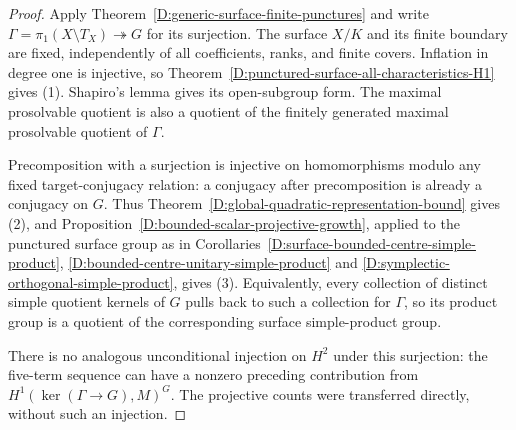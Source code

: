 \begin{proof}
Apply Theorem~\ref{D:generic-surface-finite-punctures} and write
$\Gamma=\pi_1(X\setminus T_X)\twoheadrightarrow G$ for its surjection.
The surface $X/K$ and its finite boundary are fixed, independently of
all coefficients, ranks, and finite covers. Inflation in degree one is
injective, so Theorem~\ref{D:punctured-surface-all-characteristics-H1}
gives (1). Shapiro's lemma gives its open-subgroup form. The maximal
prosolvable quotient is also a quotient of the finitely generated
maximal prosolvable quotient of $\Gamma$.

Precomposition with a surjection is injective on homomorphisms modulo
any fixed target-conjugacy relation: a conjugacy after precomposition
is already a conjugacy on $G$. Thus
Theorem~\ref{D:global-quadratic-representation-bound} gives (2), and
Proposition~\ref{D:bounded-scalar-projective-growth}, applied to the
punctured surface group as in
Corollaries~\ref{D:surface-bounded-centre-simple-product},
\ref{D:bounded-centre-unitary-simple-product} and
\ref{D:symplectic-orthogonal-simple-product}, gives (3).
Equivalently, every collection of distinct simple quotient kernels of
$G$ pulls back to such a collection for $\Gamma$, so its product group
is a quotient of the corresponding surface simple-product group.

There is no analogous unconditional injection on $H^2$ under this
surjection: the five-term sequence can have a nonzero preceding
contribution from $H^1(\ker(\Gamma\to G),M)^G$. The projective counts
were transferred directly, without such an injection.
\end{proof}
